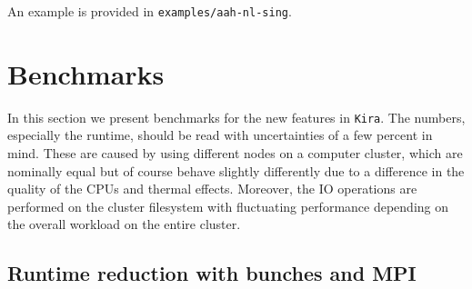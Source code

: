 \documentclass[11pt,a4paper,DIV=11,numbers=noenddot,parskip=half]{scrartcl}
\newcommand{\code}[1]{\texttt{#1}}
\newcommand*{\kiraZO}{\code{Kira\;2.0}}
\begin{document}
An example is provided in \code{examples/aah-nl-sing}.


%
%


\section{Benchmarks}
\label{sect:benchmarks}

In this section we present benchmarks for the new features in \kiraZO{}.
The numbers, especially the runtime, should be read with uncertainties of a few percent in mind.
These are caused by using different nodes on a computer cluster, which are nominally equal but of course behave slightly differently due to a difference in the quality of the CPUs and thermal effects.
Moreover, the IO operations are performed on the cluster filesystem with fluctuating performance depending on the overall workload on the entire cluster.

\subsection{Runtime reduction with bunches and MPI}
\end{document}
